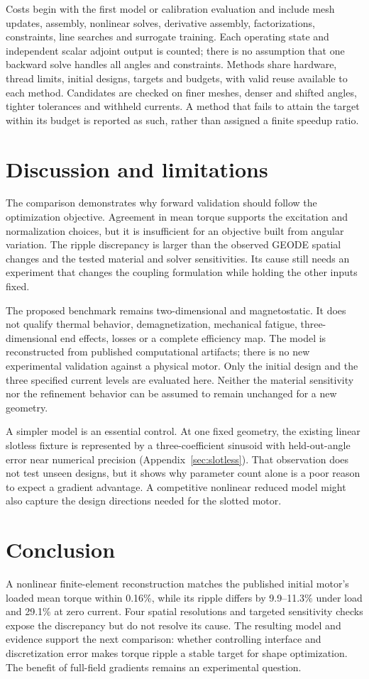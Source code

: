 \documentclass{anvil-paper}
\begin{document}
Costs begin with the first model or calibration evaluation and include
mesh updates, assembly, nonlinear solves, derivative assembly,
factorizations, constraints, line searches and surrogate training.
Each operating state and independent scalar adjoint output is counted;
there is no assumption that one backward solve handles all angles and
constraints. Methods share hardware, thread limits, initial designs,
targets and budgets, with valid reuse available to each method. Candidates
are checked on finer meshes, denser and shifted angles, tighter tolerances
and withheld currents. A method that fails to attain the target within its
budget is reported as such, rather than assigned a finite speedup ratio.

\section{Discussion and limitations}
The comparison demonstrates why forward validation should follow the
optimization objective. Agreement in mean torque supports the excitation
and normalization choices, but it is insufficient for an objective built
from angular variation. The ripple discrepancy is larger than the
observed GEODE spatial changes and the tested material and solver
sensitivities. Its cause still needs an experiment that changes the
coupling formulation while holding the other inputs fixed.

The proposed benchmark remains two-dimensional and magnetostatic. It
does not qualify thermal behavior, demagnetization, mechanical fatigue,
three-dimensional end effects, losses or a complete efficiency map.
The model is reconstructed from published computational artifacts; there
is no new experimental validation against a physical motor. Only the
initial design and the three specified current levels are evaluated here.
Neither the material sensitivity nor the refinement behavior can be
assumed to remain unchanged for a new geometry.

A simpler model is an essential control. At one fixed geometry, the
existing linear slotless fixture is represented by a three-coefficient
sinusoid with held-out-angle error near numerical precision
(Appendix~\ref{sec:slotless}). That observation does not test unseen
designs, but it shows why parameter count alone is a poor reason to
expect a gradient advantage. A competitive nonlinear reduced model might
also capture the design directions needed for the slotted motor.

\section{Conclusion}
A nonlinear finite-element reconstruction matches the published initial
motor's loaded mean torque within 0.16\%, while its ripple differs by
9.9--11.3\% under load and 29.1\% at zero current. Four spatial resolutions
and targeted sensitivity checks expose the discrepancy but do not resolve
its cause. The resulting model and evidence support the next comparison:
whether controlling interface and discretization error makes torque
ripple a stable target for shape optimization. The benefit of full-field
gradients remains an experimental question.
\end{document}
